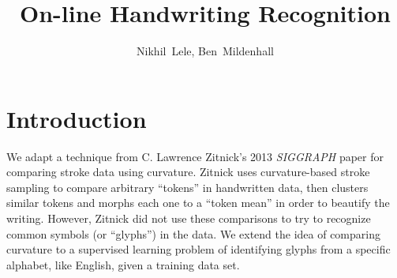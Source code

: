 \documentclass[journal]{IEEEtran}
\begin{document}
%
\title{On-line Handwriting Recognition}


\author{Nikhil~Lele,
        Ben~Mildenhall}

\maketitle



\section{Introduction}
We adapt a technique from C. Lawrence Zitnick's 2013 \emph{SIGGRAPH} paper for comparing stroke data using curvature. Zitnick uses curvature-based stroke sampling to compare arbitrary ``tokens'' in handwritten data, then clusters similar tokens and morphs each one to a ``token mean'' in order to beautify the writing. However, Zitnick did not use these comparisons to try to recognize common symbols (or ``glyphs'') in the data. We extend the idea of comparing curvature to a supervised learning problem of identifying glyphs from a specific alphabet, like English, given a training data set.
\end{document}
